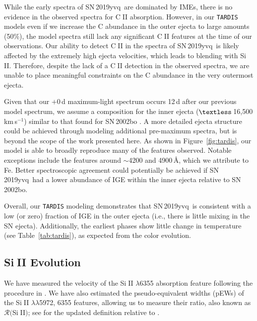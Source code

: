 \documentclass[twocolumn]{aastex63}
\def\ion#1#2{#1$\;${\footnotesize\rm{#2}}\relax}
\newcommand{\kms}{km\,s$^{-1}$}
\newcommand{\sn}{SN\,2019yvq}
\begin{document}
While the early spectra of \sn\ are dominated by IMEs, there is no evidence in
the observed spectra for \ion{C}{II} absorption. However, in our
\texttt{TARDIS} models even if we increase the C abundance in the outer ejecta
to large amounts (50\%), the model spectra still lack any significant
\ion{C}{II} features at the time of our observations. Our ability to detect
\ion{C}{II} in the spectra of \sn\ is likely affected by the extremely high
ejecta velocities, which leads to blending with \ion{Si}{II}. Therefore,
despite the lack of a \ion{C}{II} detection in the observed spectra, we are
unable to place meaningful constraints on the C abundance in the very
outermost ejecta.

Given that our $+0$\,d maximum-light spectrum occurs 12\,d after our previous
model spectrum, we assume a composition for the inner ejecta
($\textless$\,16,500\,\kms) similar to that found for SN\,2002bo
\citep{Stehle05}. A more detailed ejecta structure could be achieved through
modeling additional pre-maximum spectra, but is beyond the scope of the work
presented here. As shown in Figure~\ref{fig:tardis}, our model is able to
broadly reproduce many of the features observed. Notable exceptions include
the features around $\sim$4200 and 4900\,\AA, which we attribute to Fe. Better
spectroscopic agreement could potentially be achieved if \sn\ had a lower
abundance of IGE within the inner ejecta relative to SN\,2002bo.

Overall, our \texttt{TARDIS} modeling demonstrates that \sn\ is consistent
with a low (or zero) fraction of IGE in the outer ejecta (i.e., there is
little mixing in the SN ejecta). Additionally, the earliest phases show little
change in temperature (see Table~\ref{tab:tardis}), as expected from the color
evolution.

\subsection{\ion{Si}{II} Evolution}\label{sec:SiII}

We have measured the velocity of the \ion{Si}{II} $\lambda$6355 absorption
feature following the procedure in \citet[][see their Section~2.5]{Maguire14}.
We have also estimated the pseudo-equivalent widths (pEWs) of the \ion{Si}{II}
$\lambda\lambda$5972, 6355 features, allowing us to measure their ratio, also
known as $\mathcal{R}($\ion{Si}{II}$)$; see \citet{Hachinger08} for the
updated definition relative to \citet{Nugent95}.
\end{document}
